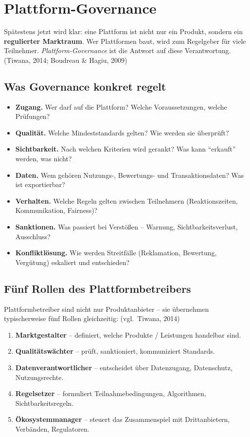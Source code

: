 \documentclass[11pt,a4paper,oneside]{article}
\newcommand{\fachbegriff}[1]{\textbf{#1}}
\newcommand{\quelle}[1]{{\footnotesize\color{lpGray}(#1)}}
\begin{document}
\section{Plattform-Governance}

Spätestens jetzt wird klar: eine Plattform ist nicht nur ein Produkt, sondern ein \fachbegriff{regulierter Marktraum}. Wer Plattformen baut, wird zum Regelgeber für viele Teilnehmer. \emph{Plattform-Governance} ist die Antwort auf diese Verantwortung. \quelle{Tiwana, 2014; Boudreau \& Hagiu, 2009}

\subsection{Was Governance konkret regelt}

\begin{itemize}
  \item \fachbegriff{Zugang.} Wer darf auf die Plattform? Welche Voraussetzungen, welche Prüfungen?
  \item \fachbegriff{Qualität.} Welche Mindeststandards gelten? Wie werden sie überprüft?
  \item \fachbegriff{Sichtbarkeit.} Nach welchen Kriterien wird gerankt? Was kann ``erkauft'' werden, was nicht?
  \item \fachbegriff{Daten.} Wem gehören Nutzungs-, Bewertungs- und Transaktionsdaten? Was ist exportierbar?
  \item \fachbegriff{Verhalten.} Welche Regeln gelten zwischen Teilnehmern (Reaktionszeiten, Kommunikation, Fairness)?
  \item \fachbegriff{Sanktionen.} Was passiert bei Verstößen -- Warnung, Sichtbarkeitsverlust, Ausschluss?
  \item \fachbegriff{Konfliktlösung.} Wie werden Streitfälle (Reklamation, Bewertung, Vergütung) eskaliert und entschieden?
\end{itemize}

\subsection{Fünf Rollen des Plattformbetreibers}

Plattformbetreiber sind nicht nur Produktanbieter -- sie übernehmen typischerweise fünf Rollen gleichzeitig: \quelle{vgl.\ Tiwana, 2014}

\begin{enumerate}
  \item \textbf{Marktgestalter} -- definiert, welche Produkte / Leistungen handelbar sind.
  \item \textbf{Qualitätswächter} -- prüft, sanktioniert, kommuniziert Standards.
  \item \textbf{Datenverantwortlicher} -- entscheidet über Datenzugang, Datenschutz, Nutzungsrechte.
  \item \textbf{Regelsetzer} -- formuliert Teilnahmebedingungen, Algorithmen, Sichtbarkeitsregeln.
  \item \textbf{Ökosystemmanager} -- steuert das Zusammenspiel mit Drittanbietern, Verbänden, Regulatoren.
\end{enumerate}
\end{document}
